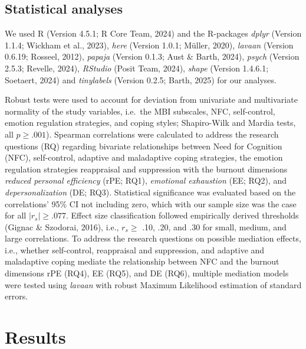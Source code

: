 \documentclass[
  man]{apa6}
\begin{document}
\subsection{Statistical analyses}\label{statistical-analyses}

We used R (Version 4.5.1; R Core Team, 2024) and the R-packages \emph{dplyr} (Version 1.1.4; Wickham et al., 2023), \emph{here} (Version 1.0.1; Müller, 2020), \emph{lavaan} (Version 0.6.19; Rosseel, 2012), \emph{papaja} (Version 0.1.3; Aust \& Barth, 2024), \emph{psych} (Version 2.5.3; Revelle, 2024), \emph{RStudio} (Posit Team, 2024), \emph{shape} (Version 1.4.6.1; Soetaert, 2024) and \emph{tinylabels} (Version 0.2.5; Barth, 2025) for our analyses.

Robust tests were used to account for deviation from univariate and multivariate normality of the study variables, i.e.~the MBI subscales, NFC, self-control, emotion regulation strategies, and coping styles; Shapiro-Wilk and Mardia tests, all \(p\ge.001\)). Spearman correlations were calculated to address the research questions (RQ) regarding bivariate relationships between Need for Cognition (NFC), self-control, adaptive and maladaptive coping strategies, the emotion regulation strategies reappraisal and suppression with the burnout dimensions \emph{reduced personal efficiency} (rPE; RQ1), \emph{emotional exhaustion} (EE; RQ2), and \emph{depersonalization} (DE; RQ3). Statistical significance was evaluated based on the correlations' 95\% CI not including zero, which with our sample size was the case for all \(|r_{s}|\ge.077\). Effect size classification followed empirically derived thresholds (Gignac \& Szodorai, 2016), i.e., \(r_{s} \ge\) .10, .20, and .30 for small, medium, and large correlations. To address the research questions on possible mediation effects, i.e., whether self-control, reappraisal and suppression, and adaptive and maladaptive coping mediate the relationship between NFC and the burnout dimensions rPE (RQ4), EE (RQ5), and DE (RQ6), multiple mediation models were tested using \emph{lavaan} with robust Maximum Likelihood estimation of standard errors.

\section{Results}\label{results}
\end{document}
